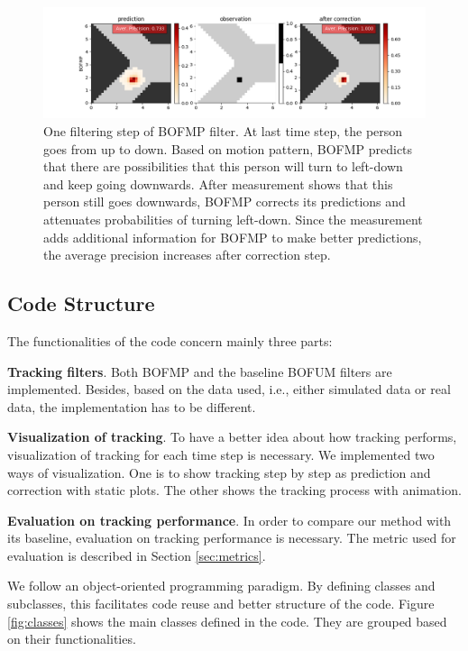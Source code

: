 \begin{figure}[ht]
  \centering
    \includegraphics[width=\textwidth]{figures/correction_step.png}
    \caption[One filtering step of BOFMP filter.]{One filtering step of BOFMP filter. At last time step, the person goes from up to down. Based on motion pattern, BOFMP predicts that there are possibilities that this person will turn to left-down and keep going downwards. After measurement shows that this person still goes downwards, BOFMP corrects its predictions and attenuates probabilities of turning left-down. Since the measurement adds additional information for BOFMP to make better predictions, the average precision increases after correction step.}
    \label{fig:correction}
\end{figure}

\subsection{Code Structure}

The functionalities of the code concern mainly three parts:
\begin{my_enumerate}
\item \textbf{Tracking filters}. Both BOFMP and the baseline BOFUM filters are implemented. Besides, based on the data used, i.e., either simulated data or real data, the implementation has to be different. 
\item \textbf{Visualization of tracking}. To have a better idea about how tracking performs, visualization of tracking for each time step is necessary. We implemented two ways of visualization. One is to show tracking step by step as prediction and correction with static plots. The other shows the tracking process with animation. 
\item \textbf{Evaluation on tracking performance}. In order to compare our method with its baseline, evaluation on tracking performance is necessary. The metric used for evaluation is described in Section \ref{sec:metrics}.
\end{my_enumerate}

We follow an object-oriented programming paradigm. By defining classes and subclasses, this facilitates code reuse and better structure of the code. Figure \ref{fig:classes} shows the main classes defined in the code. They are grouped based on their functionalities. 

